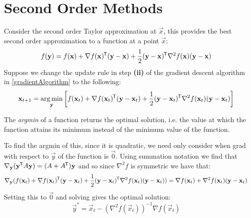 \documentclass[../main.tex]{subfiles}
\begin{document}
\section{Second Order Methods}
Consider the second order Taylor approximation at $\vec{x}$, this provides the best second order approximation to a function at a point $\vec{x}$:
\[
  f(\mathbf{\bm{y}}) = f(\mathbf{\bm{x}}) + \nabla f(\mathbf{\bm{x}})^{{\mkern-1.5mu\mathsf{T}}} (\mathbf{\bm{y}} - \mathbf{\bm{x}}) + \frac{1}{2} (\mathbf{\bm{y}} - \mathbf{\bm{x}})^{{\mkern-1.5mu\mathsf{T}}} \nabla^2 f(\mathbf{\bm{x}}) (\mathbf{\bm{y}} - \mathbf{\bm{x}})
\]
Suppose we change the update rule in step \textbf{(ii)} of the gradient descent algorithm in \cref{gradientAlgorithm} to the following:
\[
  \mathbf{\bm{x}}_{t + 1} = \operatorname*{arg\,min}_{\mathbf{\bm{y}}} \left[f(\mathbf{\bm{x}}_t) + \nabla f(\mathbf{\bm{x}}_t)^{{\mkern-1.5mu\mathsf{T}}} (\mathbf{\bm{y}} - \mathbf{\bm{x}}_t) + \frac{1}{2} (\mathbf{\bm{y}} - \mathbf{\bm{x}}_t)^{{\mkern-1.5mu\mathsf{T}}} \nabla^2 f(\mathbf{\bm{x}}_t) (\mathbf{\bm{y}} - \mathbf{\bm{x}}_t)\right]
\]
\begin{remark}[Notation]
  The \textit{argmin} of a function returns the optimal solution, i.e. the value at which the function attains its minimum instead of the minimum value of the function.
\end{remark}
To find the argmin of this, since it is quadratic, we need only consider when grad with respect to $\vec{y}$ of the function is $\vec{0}$.
Using summation notation we find that $\nabla_{\mathbf{\bm{y}}} (\mathbf{\bm{y}}^{{\mkern-1.5mu\mathsf{T}}} A \mathbf{\bm{y}}) = (A + A^{{\mkern-1.5mu\mathsf{T}}}) \mathbf{\bm{y}}$ and so since $\nabla^2 f$ is symmetric we have that:
\[
  \nabla_{\mathbf{\bm{y}}} (f(\mathbf{\bm{x}}_t) + \nabla f(\mathbf{\bm{x}}_t)^{{\mkern-1.5mu\mathsf{T}}} (\mathbf{\bm{y}} - \mathbf{\bm{x}}_t) + \frac{1}{2} (\mathbf{\bm{y}} - \mathbf{\bm{x}}_t)^{{\mkern-1.5mu\mathsf{T}}} \nabla^2 f(\mathbf{\bm{x}}_t) (\mathbf{\bm{y}} - \mathbf{\bm{x}}_t)) = \nabla f(\mathbf{\bm{x}}_t) + \nabla^2f(\mathbf{\bm{x}}_t) (\mathbf{\bm{y}} - \mathbf{\bm{x}}_t)
\]
Setting this to $\vec{0}$ and solving gives the optimal solution:
\[
  \vec{y}^{*} = \vec{x}_t - (\nabla^2 f(\vec{x}_t))^{-1} \nabla f(\vec{x}_t)
\]
\end{document}
